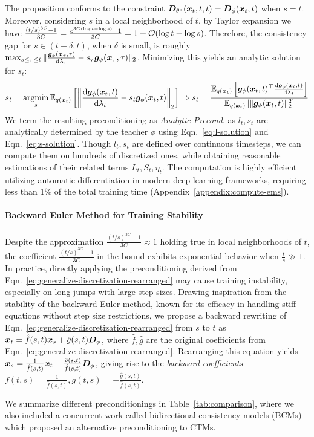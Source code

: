 The proposition conforms to the constraint $\bm{D}_{\theta^*}(\bm{x}_t,t,t)=\bm{D}_\phi(\bm{x}_t,t)$ when $s=t$. Moreover, considering $s$ in a local neighborhood of $t$, by Taylor expansion we have $\frac{(t/s)^{3C}-1}{3C}=\frac{e^{3C(\log t-\log s)}-1}{3C}=1+\mathcal O(\log t-\log s)$. Therefore, the consistency gap for $s\in (t-\delta,t)$, when $\delta$ is small, is roughly $\max_{s\leq \tau\leq t} \|\frac{\bm{g}_\phi(\bm{x}_\tau,\tau)}{\mathrm{d}\lambda_\tau}-s_\tau\bm{g}_\phi(\bm{x}_\tau,\tau)\|_2$. Minimizing this yields an analytic solution for $s_t$:
\begin{equation}
\label{eq:s-solution}
s_t=\argmin_{s}\E_{q(\x_t)}\left[\left\|\frac{\dm\gv_\phi(\x_t,t)}{\dm\lambda_t}-s_t\gv_\phi(\x_t,t)\right\|_2\right]\Rightarrow s_t=\frac{\E_{q(\x_t)}\left[\gv_\phi(\x_t,t)^\top\frac{\dm\gv_\phi(\x_t,t)}{\dm\lambda_t}\right]}{\E_{q(\x_t)}\left[\|\gv_\phi(\x_t,t)\|_2^2\right]}
\end{equation}
We term the resulting preconditioning as \textit{Analytic-Precond}, as $l_t,s_t$ are analytically determined by the teacher $\phi$ using Eqn.~\eqref{eq:l-solution} and Eqn.~\eqref{eq:s-solution}. Though $l_t,s_t$ are defined over continuous timesteps, we can compute them on hundreds of discretized ones, while obtaining reasonable estimations of their related terms $L_t,S_t,\eta_t$. The computation is highly efficient utilizing automatic differentiation in modern deep learning frameworks, requiring less than 1\% of the total training time (Appendix~\ref{appendix:compute-ems}).
\paragraph{Backward Euler Method for Training Stability} Despite the approximation $\frac{(t/s)^{3C}-1}{3C}\approx 1$ holding true in local neighborhoods of $t$, the coefficient $\frac{(t/s)^{3C}-1}{3C}$ in the bound exhibits exponential behavior when $\frac{t}{s}\gg 1$. In practice, directly applying the preconditioning derived from Eqn.~\eqref{eq:generalize-discretization-rearranged} may cause training instability, especially on long jumps with large step sizes. Drawing inspiration from the stability of the backward Euler method, known for its efficacy in handling stiff equations without step size restrictions, we propose a backward rewriting of Eqn.~\eqref{eq:generalize-discretization-rearranged} from $s$ to $t$ as $\bm{x}_t=\hat f(s,t)\bm{x}_s+\hat g(s,t)\bm{D}_\phi$, where $\hat f,\hat g$ are the original coefficients from Eqn.~\eqref{eq:generalize-discretization-rearranged}. Rearranging this equation yields $\bm{x}_s=\frac{1}{\hat f(s,t)}\bm{x}_t-\frac{\hat g(s,t)}{\hat f(s,t)}\bm{D}_\phi$, giving rise to the \textit{backward coefficients} $f(t,s)=\frac{1}{\hat f(s,t)},g(t,s)=-\frac{\hat g(s,t)}{\hat f(s,t)}$. 

We summarize different preconditionings in Table~\ref{tab:comparison}, where we also included a concurrent work called bidirectional consistency models (BCMs)~\citep{li2024bidirectional} which proposed an alternative preconditioning to CTMs.